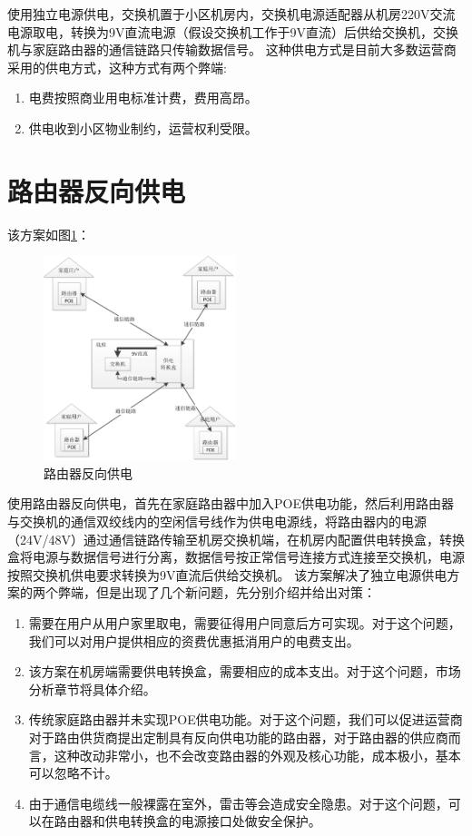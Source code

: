 \documentclass[12pt,a4paper]{report}
\begin{document}
使用独立电源供电，交换机置于小区机房内，交换机电源适配器从机房220V交流电源取电，转换为9V直流电源（假设交换机工作于9V直流）后供给交换机，交换机与家庭路由器的通信链路只传输数据信号。
这种供电方式是目前大多数运营商采用的供电方式，这种方式有两个弊端:
\begin{enumerate}
    \item 电费按照商业用电标准计费，费用高昂。
    \item 供电收到小区物业制约，运营权利受限。
\end{enumerate}
\section{路由器反向供电}
该方案如图\ref{路由器反向供电}：
\begin{figure}
    \begin{center}
    \includegraphics[width=0.5\textwidth]{fig/反向供电.jpg}
    \caption{路由器反向供电}
    \label{路由器反向供电}
    \end{center}
\end{figure}

使用路由器反向供电，首先在家庭路由器中加入POE供电功能，然后利用路由器与交换机的通信双绞线内的空闲信号线作为供电电源线，将路由器内的电源（24V/48V）通过通信链路传输至机房交换机端，在机房内配置供电转换盒，转换盒将电源与数据信号进行分离，数据信号按正常信号连接方式连接至交换机，电源按照交换机供电要求转换为9V直流后供给交换机。
该方案解决了独立电源供电方案的两个弊端，但是出现了几个新问题，先分别介绍并给出对策：
\begin{enumerate}
    \item 需要在用户从用户家里取电，需要征得用户同意后方可实现。对于这个问题，我们可以对用户提供相应的资费优惠抵消用户的电费支出。
    \item 该方案在机房端需要供电转换盒，需要相应的成本支出。对于这个问题，市场分析章节将具体介绍。
    \item 传统家庭路由器并未实现POE供电功能。对于这个问题，我们可以促进运营商对于路由供货商提出定制具有反向供电功能的路由器，对于路由器的供应商而言，这种改动非常小，也不会改变路由器的外观及核心功能，成本极小，基本可以忽略不计。
    \item 由于通信电缆线一般裸露在室外，雷击等会造成安全隐患。对于这个问题，可以在路由器和供电转换盒的电源接口处做安全保护。
\end{enumerate}
\end{document}
